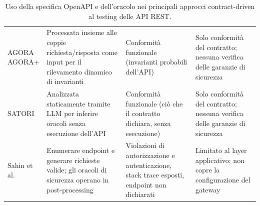 \begin{table}[ht]
\begin{tabularx}{\textwidth}{@{\hspace{0.5em}} l >{\raggedright\arraybackslash}X >{\raggedright\arraybackslash}X >{\raggedright\arraybackslash}X @{\hspace{0.5em}}}
    \addlinespace
    \makecell[l]{AGORA \cite{alonsoAGORAAutomatedGeneration2023}                                                                                                                                                                                                                                                                                                                  \\ AGORA+ \cite{alonsoAgora+TestOracleGeneration2025}} & Processata insieme alle coppie richiesta/risposta come input per il rilevamento dinamico di invarianti & Conformità funzionale (invarianti probabili dell'\gls{API})                  & Solo conformità del contratto; nessuna verifica delle garanzie di sicurezza \\
    \addlinespace
    SATORI \cite{alonsoSATORIStaticTest2025}                          & Analizzata staticamente tramite \gls{LLM} per inferire oracoli senza esecuzione dell'\gls{API}      & Conformità funzionale (ciò che il contratto dichiara, senza esecuzione)                     & Solo conformità del contratto; nessuna verifica delle garanzie di sicurezza                           \\
    \addlinespace
    Sahin et al. \cite{sahinEnhancingRESTAPI2026}                     & Enumerare endpoint e generare richieste valide; gli oracoli di sicurezza operano in post-processing & Violazioni di autorizzazione e autenticazione, stack trace esposti, endpoint non dichiarati & Limitato al layer applicativo; non copre la configurazione del gateway                                \\
    \bottomrule
  \end{tabularx}
  \caption{Uso della specifica OpenAPI e dell'oracolo nei principali approcci contract-driven al testing delle \gls{API} REST.}
  \label{tab:contract-driven-tools}
\end{table}